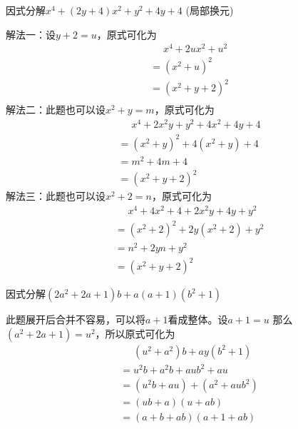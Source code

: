 \documentclass[windows,csize4,answers]{BHCexam}
\begin{document}
\begin{groups}
\begin{questions}[]
        \question[5]因式分解$x^4+(2y+4)x^2+y^2+4y+4$ (局部换元)
        \begin{solution}{0.5cm}
            \methodonly 解法一：设$y+2=u$，原式可化为
            \[
                \begin{aligned}
                     & \phantom{=}x^4+2ux^2+u^2 \\
                     & =(x^2+u)^2               \\
                     & =(x^2+y+2)^2             \\
                \end{aligned}
            \]
            解法二：此题也可以设$x^2+y=m$，原式可化为
            \[
                \begin{aligned}
                     & \phantom{=}x^4+2x^2 y+y^2+4x^2+4y+4 \\
                     & =(x^2+y)^2 + 4(x^2+y) +4            \\
                     & =m^2+4m+4                           \\
                     & =(x^2+y+2)^2
                \end{aligned}
            \]
            解法三：此题也可以设$x^2+2=n$，原式可化为
            \[
                \begin{aligned}
                     & \phantom{=}x^4+4x^2+4+2x^2 y+4y+y^2 \\
                     & =(x^2+2)^2+2y(x^2+2)+y^2            \\
                     & =n^2+2yn+y^2                        \\
                     & =(x^2+y+2)^2
                \end{aligned}
            \]
        \end{solution}
        \vspace{3.5cm}

        \question[5] 因式分解$(2a^2+2a+1)b+a(a+1)(b^2+1)$
        \begin{solution}{0.5cm}
            \methodonly 此题展开后合并不容易，可以将$a+1$看成整体。设$a+1=u$
            那么$(a^2+2a+1)=u^2$，所以原式可化为
            \[
                \begin{aligned}
                     & \phantom{=}(u^2+a^2)b+ay(b^2+1) \\
                     & =u^2b+a^2b+aub^2+au             \\
                     & =(u^2b+au)+(a^2+aub^2)          \\
                     & =(ub+a)(u+ab)                   \\
                     & =(a+b+ab)(a+1+ab)
                \end{aligned}
            \]
        \end{solution}



    \end{questions}
\end{groups}



\label{lastpage}
\end{document}
